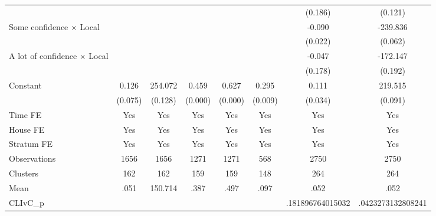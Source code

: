{\begin{tabular}{l*{7}{c}}
                &                  &                  &                  &                  &                  &  (0.186)         &  (0.121)         \\
Some confidence $\times$ Local&                  &                  &                  &                  &                  &   -0.090\sym{**} & -239.836\sym{*}  \\
                &                  &                  &                  &                  &                  &  (0.022)         &  (0.062)         \\
A lot of confidence $\times$ Local&                  &                  &                  &                  &                  &   -0.047         & -172.147         \\
                &                  &                  &                  &                  &                  &  (0.178)         &  (0.192)         \\
Constant        &    0.126\sym{*}  &  254.072         &    0.459\sym{***}&    0.627\sym{***}&    0.295\sym{**} &    0.111\sym{**} &  219.515\sym{*}  \\
                &  (0.075)         &  (0.128)         &  (0.000)         &  (0.000)         &  (0.009)         &  (0.034)         &  (0.091)         \\
Time FE         &      Yes         &      Yes         &      Yes         &      Yes         &      Yes         &      Yes         &      Yes         \\
House FE        &      Yes         &      Yes         &      Yes         &      Yes         &      Yes         &      Yes         &      Yes         \\
Stratum FE      &      Yes         &      Yes         &      Yes         &      Yes         &      Yes         &      Yes         &      Yes         \\
\hline
Observations    &     1656         &     1656         &     1271         &     1271         &      568         &     2750         &     2750         \\
Clusters        &      162         &      162         &      159         &      159         &      148         &      264         &      264         \\
Mean            &     .051         &  150.714         &     .387         &     .497         &     .097         &     .052         &     .052         \\
CLIvC\_p         &                  &                  &                  &                  &                  &.181896764015032         &.0423273132808241         \\
\hline\hline
\end{tabular}
}
